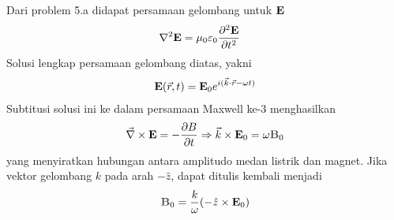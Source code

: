Dari problem 5.a didapat persamaan gelombang untuk $\vE$
\begin{align*}
    \nabla^2 \vE&=\mu_0\epsilon_0 \frac{\partial^2 \vE}{\partial t^2}
\end{align*}
Solusi lengkap persamaan gelombang diatas, yakni
\begin{align*}
    \vE(\vr, t)=\vE_0 e^{i(\vk\cdot\vr-\omega t)}
\end{align*}
Subtitusi solusi ini ke dalam persamaan Maxwell ke-3 menghasilkan 
\begin{align*}
    \Curl \vE = -\frac{\partial B}{\partial t} \Rightarrow \vk \times \vE_0 = \omega\vB_0
\end{align*}
yang menyiratkan hubungan antara amplitudo medan listrik dan magnet. Jika vektor gelombang $k$ pada arah $-\hat{z}$, dapat ditulis kembali menjadi
\begin{align*}
    \vB_0=\frac{k}{\omega}(-\hat{z}\times \vE_0)
\end{align*}

